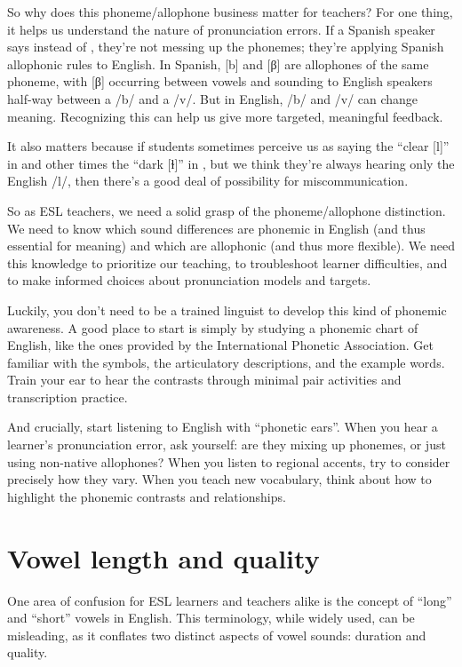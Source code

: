 So why does this phoneme/allophone business matter for teachers? For one thing, it helps us understand the nature of pronunciation errors. If a Spanish speaker says  instead of , they're not messing up the phonemes; they're applying Spanish allophonic rules to English. In Spanish, [b] and [β] are allophones of the same phoneme, with [β] occurring between vowels and sounding to English speakers half-way between a /b/ and a /v/. But in English, /b/ and /v/ can change meaning. Recognizing this can help us give more targeted, meaningful feedback.

It also matters because if students sometimes perceive us as saying the \enquote{clear [l]} in  and other times the \enquote{dark [ɫ]} in , but we think they're always hearing only the English /l/, then there's a good deal of possibility for miscommunication.

So as ESL teachers, we need a solid grasp of the phoneme/allophone distinction. We need to know which sound differences are phonemic in English (and thus essential for meaning) and which are allophonic (and thus more flexible). We need this knowledge to prioritize our teaching, to troubleshoot learner difficulties, and to make informed choices about pronunciation models and targets.

Luckily, you don't need to be a trained linguist to develop this kind of phonemic awareness. A good place to start is simply by studying a phonemic chart of English, like the ones provided by the International Phonetic Association. Get familiar with the symbols, the articulatory descriptions, and the example words. Train your ear to hear the contrasts through minimal pair activities and transcription practice. 

And crucially, start listening to English with \enquote{phonetic ears}. When you hear a learner's pronunciation error, ask yourself: are they mixing up phonemes, or just using non-native allophones? When you listen to regional accents, try to consider precisely how they vary. When you teach new vocabulary, think about how to highlight the phonemic contrasts and relationships.


\section{Vowel length and quality} \label{sec:long-vowels}

One area of confusion for ESL learners and teachers alike is the concept of \enquote{long} and \enquote{short} vowels in English. This terminology, while widely used, can be misleading, as it conflates two distinct aspects of vowel sounds: duration and quality.

